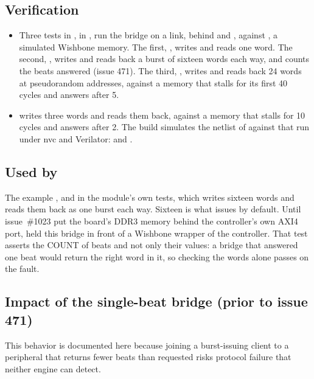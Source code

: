 \subsection*{Verification}

\begin{itemize}
\item Three tests in , in ,
run the bridge on a link, behind  and ,
against , a simulated Wishbone memory. The first,
, writes and reads one word.
The second, , writes and
reads back a burst of sixteen words each way, and counts the beats
answered (issue 471).
The third, , writes and
reads back 24 words at pseudorandom addresses, against a memory that
stalls for its first 40 cycles and answers after 5.
\item {} writes three words and reads them back, against
a memory that stalls for 10 cycles and answers after 2. The build
simulates the netlist of  against that run under
nvc and Verilator:  and
.
\end{itemize}

\subsection*{Used by}

The example , and
 in the module's own
tests, which writes sixteen words and reads them back as one burst
each way. Sixteen is what  issues by default.
Until issue~\#1023 put the board's DDR3 memory behind the controller's
own AXI4 port,  held this bridge in front of a Wishbone
wrapper of the controller.
That test asserts the COUNT of beats and not only their values: a
bridge that answered one beat would return the right word in it, so
checking the words alone passes on the fault.

\subsection*{Impact of the single-beat bridge (prior to issue 471)}

This behavior is documented here because joining a burst-issuing client
to a peripheral that returns fewer beats than requested risks protocol
failure that neither engine can detect.

